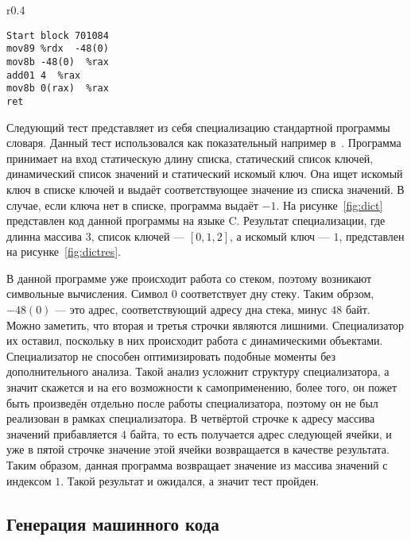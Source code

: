 \begin{wrapfigure}{r}{0.4\textwidth}
\begin{lstlisting}[xleftmargin = 20pt]
Start block 701084
mov89 %rdx  -48(0) 
mov8b -48(0)  %rax 
add01 4  %rax 
mov8b 0(rax)  %rax 
ret
\end{lstlisting}
\caption{Результат специализации словаря}
\label{fig:dictres}
\end{wrapfigure}
Следующий тест представляет из себя специализацию стандартной программы словаря.
Данный тест использовался как показательный например в~\cite{PEAPG}.
Программа принимает на вход статическую длину списка, статический список ключей, динамический список значений и статический искомый ключ.
Она ищет искомый ключ в списке ключей и выдаёт соответствующее значение из списка значений. В случае, если ключа нет в списке, программа выдаёт $-1$. На рисунке~\ref{fig:dict} представлен код данной программы на языке \textsf{C}.
Результат специализации, где длинна массива $3$, список ключей --- $[0, 1, 2]$, а искомый ключ --- $1$, представлен на рисунке~\ref{fig:dictres}.

В данной программе уже происходит работа со стеком, поэтому возникают символьные вычисления.
Символ $0$ соответствует дну стеку.
Таким обрзом, $-48(0)$ --- это адрес, соответствующий адресу дна стека, минус $48$ байт. Можно заметить, что вторая и третья строчки являются лишними. Специализатор их оставил, поскольку в них происходит работа с динамическими объектами.
Специализатор не способен оптимизировать подобные моменты без дополнительного анализа.
Такой анализ усложнит структуру специализатора, а значит скажется и на его возможности к самоприменению, более того,
он пожет быть произведён отдельно после работы специализатора, поэтому он не был реализован в рамках специализатора.
В четвёртой строчке к адресу массива значений прибавляется $4$ байта, то есть получается адрес следующей ячейки, и уже в пятой строчке значение этой ячейки возвращается в качестве результата. Таким образом, данная программа возвращает значение из массива значений с индексом $1$. Такой результат и ожидался, а значит тест пройден.


\subsection{ Генерация машинного кода}

